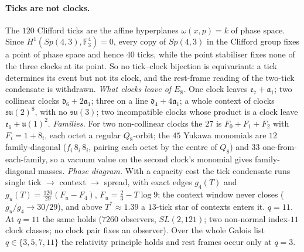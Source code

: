 \paragraph{Ticks are not clocks.}
The $120$ Clifford ticks are the affine hyperplanes $\omega(x,p)=k$ of phase space. Since
$H^1(Sp(4,3),\mathbb F_3^4)=0$, every copy of $Sp(4,3)$ in the Clifford group fixes a point of phase space and hence
$40$ ticks, while the point stabiliser fixes none of the three clocks at its point. So no tick--clock bijection is
equivariant: a tick determines its event but not its clock, and the rest-frame reading of the two-tick condensate is
withdrawn. 
\emph{What clocks leave of $E_8$.} One clock leaves $\mathfrak e_7+\mathfrak a_1$; two collinear clocks
$\mathfrak d_6+2\mathfrak a_1$; three on a line $\mathfrak d_4+4\mathfrak a_1$; a whole context of clocks
$\mathfrak{su}(2)^8$, with no $\mathfrak{su}(3)$; two incompatible clocks whose product is a clock leave
$\mathfrak e_6+\mathfrak u(1)^2$. 
\emph{Families.} For two non-collinear clocks the $27$ is $F_0+F_1+F_2$ with $F_i=1+8_i$, each octet a regular
$Q_8$-orbit; the $45$ Yukawa monomials are $12$ family-diagonal ($f_i\,8_i\,8_i$, pairing each octet by the centre
of $Q_8$) and $33$ one-from-each-family, so a vacuum value on the second clock's monomial gives family-diagonal
masses. 
\emph{Phase diagram.} With a capacity cost the tick condensate runs single tick $\to$ context $\to$ spread,
with exact edges $g_4(T)$ and $g_u(T)=\tfrac{120}{29}(F_u-F_4)$, $F_u=\tfrac23-T\log9$; the context window never
closes ($g_u/g_4\to30/29$), and above $T^*\approx1.39$ a $13$-tick star of contexts enters it. 
\emph{$q=11$.} At $q=11$ the same holds ($7260$ observers, $SL(2,121)$; two non-normal index-$11$ clock classes; no clock pair fixes an observer). Over the whole Galois list $q\in\{3,5,7,11\}$ the relativity principle holds and rest frames occur only at $q=3$. 

